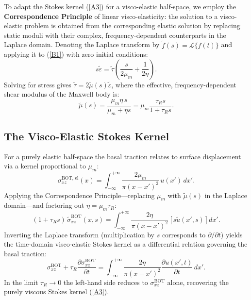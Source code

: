 \documentclass{article}
\begin{document}
To adapt the Stokes kernel (\ref{A3}) for a visco-elastic half-space, we
employ the \textbf{Correspondence Principle} of linear visco-elasticity: the
solution to a visco-elastic problem is obtained from the corresponding elastic
solution by replacing static moduli with their complex, frequency-dependent
counterparts in the Laplace domain. Denoting the Laplace transform by
$\tilde{f}(s) = \mathcal{L}\{f(t)\}$ and applying it to (\ref{B1}) with zero
initial conditions:
\begin{equation}
s\tilde{\varepsilon} = \tilde{\tau}\!\left(\frac{s}{2\mu_m}+\frac{1}{2\eta}\right).
\label{B2}
\end{equation}
Solving for stress gives $\tilde{\tau} = 2\tilde{\mu}(s)\tilde{\varepsilon}$,
where the effective, frequency-dependent shear modulus of the Maxwell body is:
\begin{equation}
\tilde{\mu}(s) = \frac{\mu_m\eta\,s}{\mu_m + \eta s}
               = \mu_m\frac{\tau_R s}{1+\tau_R s}.
\label{B4}
\end{equation}

\subsection{The Visco-Elastic Stokes Kernel}

For a purely elastic half-space the basal traction relates to surface
displacement via a kernel proportional to $\mu_m$:
\begin{equation}
\sigma_{xz}^{\text{BOT, el}}(x) =
  \int_{-\infty}^{+\infty}\frac{2\mu_m}{\pi(x-x')^2}\,u(x')\,dx'.
\label{B5}
\end{equation}
Applying the Correspondence Principle---replacing $\mu_m$ with $\tilde{\mu}(s)$
in the Laplace domain---and factoring out $\eta = \mu_m\tau_R$:
\begin{equation}
(1+\tau_R s)\,\tilde{\sigma}_{xz}^{\text{BOT}}(x,s) =
  \int_{-\infty}^{+\infty}\frac{2\eta}{\pi(x-x')^2}
  \left[s\tilde{u}(x',s)\right]dx'.
\label{B8}
\end{equation}
Inverting the Laplace transform (multiplication by $s$ corresponds to
$\partial/\partial t$) yields the time-domain visco-elastic Stokes kernel as a
differential relation governing the basal traction:
\begin{equation}
\sigma_{xz}^{\text{BOT}} + \tau_R\frac{\partial\sigma_{xz}^{\text{BOT}}}{\partial t}
= \int_{-\infty}^{+\infty}\frac{2\eta}{\pi(x-x')^2}
  \frac{\partial u(x',t)}{\partial t}\,dx'.
\label{B9}
\end{equation}
In the limit $\tau_R\to 0$ the left-hand side reduces to
$\sigma_{xz}^{\text{BOT}}$ alone, recovering the purely viscous Stokes kernel
(\ref{A3}).
\end{document}
